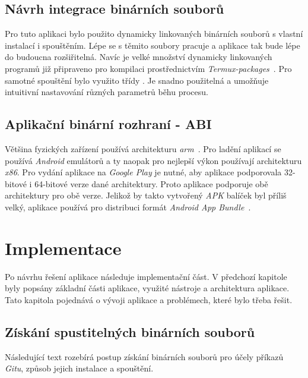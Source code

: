 \section{Návrh integrace binárních souborů}
Pro tuto aplikaci bylo použito dynamicky linkovaných binárních souborů s vlastní instalací i spouštěním. Lépe se s těmito soubory pracuje a aplikace tak bude lépe do budoucna rozšiřitelná. Navíc je velké množství dynamicky linkovaných programů již připraveno pro kompilaci prostřednictvím \emph{Termux-packages}~. Pro samotné spouštění bylo využito třídy . Je snadno použitelná a umožňuje intuitivní nastavování různých parametrů běhu procesu.

\section{Aplikační binární rozhraní - ABI}
Většina fyzických zařízení používá architekturu \emph{arm}~. Pro ladění aplikací se používá \emph{Android} emulátorů a ty naopak pro nejlepší výkon používají architekturu \emph{x86}. Pro vydání aplikace na \emph{Google Play} je nutné, aby aplikace podporovala 32-bitové i 64-bitové verze dané architektury. Proto aplikace podporuje obě architektury pro obě verze. Jelikož by takto vytvořený \emph{APK} balíček byl příliš velký, aplikace používá pro distribuci formát \emph{Android App Bundle}~\label{abi_aab}.
    
\chapter{Implementace}
Po návrhu řešení aplikace následuje implementační část. V předchozí kapitole byly popsány základní části aplikace, využité nástroje a architektura aplikace. Tato kapitola pojednává o vývoji aplikace a problémech, které bylo třeba řešit.

\section{Získání spustitelných binárních souborů}
Následující text rozebírá postup získání binárních souborů pro účely příkazů \emph{Gitu}, způsob jejich instalace a spouštění.

